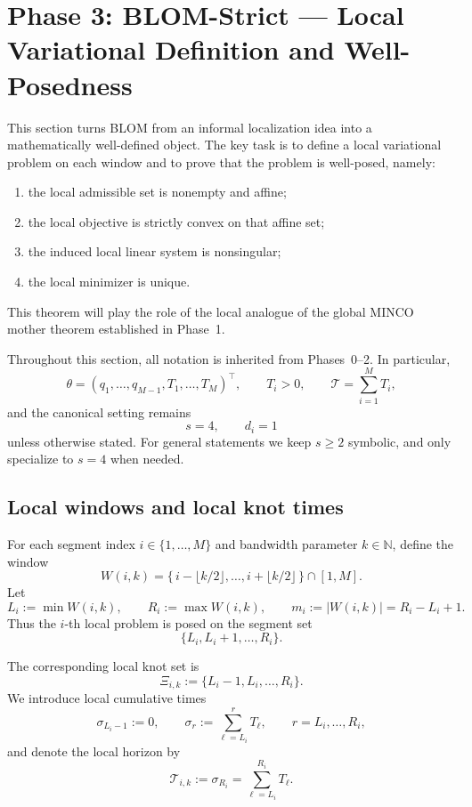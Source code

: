 \section{Phase 3: BLOM-Strict --- Local Variational Definition and Well-Posedness}
\label{sec:phase3_blom_strict}

This section turns BLOM from an informal localization idea into a mathematically well-defined object.
The key task is to define a local variational problem on each window and to prove that the problem is well-posed, namely:
\begin{enumerate}
    \item the local admissible set is nonempty and affine;
    \item the local objective is strictly convex on that affine set;
    \item the induced local linear system is nonsingular;
    \item the local minimizer is unique.
\end{enumerate}
This theorem will play the role of the local analogue of the global MINCO mother theorem established in Phase~1.

Throughout this section, all notation is inherited from Phases~0--2.
In particular,
\[
\theta=(q_1,\dots,q_{M-1},T_1,\dots,T_M)^\top,
\qquad
T_i>0,
\qquad
\mathcal T=\sum_{i=1}^{M}T_i,
\]
and the canonical setting remains
\[
s=4,\qquad d_i=1
\]
unless otherwise stated.
For general statements we keep \(s\ge 2\) symbolic, and only specialize to \(s=4\) when needed.

\subsection{Local windows and local knot times}
\label{subsec:phase3_windows}

For each segment index \(i\in\{1,\dots,M\}\) and bandwidth parameter \(k\in\mathbb N\), define the window
\begin{equation}
\label{eq:phase3_window}
W(i,k)
=
\{\,i-\lfloor k/2\rfloor,\dots,i+\lfloor k/2\rfloor\,\}\cap[1,M].
\end{equation}
Let
\[
L_i:=\min W(i,k),\qquad R_i:=\max W(i,k),\qquad m_i:=|W(i,k)|=R_i-L_i+1.
\]
Thus the \(i\)-th local problem is posed on the segment set
\[
\{L_i,L_i+1,\dots,R_i\}.
\]

The corresponding local knot set is
\[
\Xi_{i,k}:=\{L_i-1,L_i,\dots,R_i\}.
\]
We introduce local cumulative times
\begin{equation}
\label{eq:phase3_local_knots}
\sigma_{L_i-1}:=0,
\qquad
\sigma_r:=\sum_{\ell=L_i}^{r}T_\ell,
\qquad
r=L_i,\dots,R_i,
\end{equation}
and denote the local horizon by
\begin{equation}
\label{eq:phase3_local_horizon}
\mathcal T_{i,k}:=\sigma_{R_i}=\sum_{\ell=L_i}^{R_i}T_\ell.
\end{equation}

